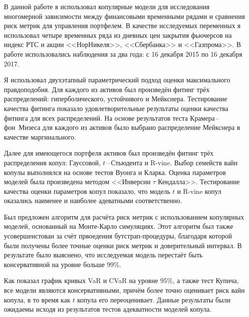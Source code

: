 \newpage


В данной работе я использовал копулярные модели для исследования многомерной зависимости между финансовыми временными рядами и сравнения риск метрик для управления портфелем.
В качестве исследуемых переменных я использовал четыре временных ряда из дневных цен закрытия фьючерсов на индекс РТС и акции <<НорНикеля>>, <<Сбербанка>> и <<Газпрома>>.
В работе использовались наблюдения за два года: с 16 декабря 2015 по 16 декабря 2017.

Я использовал двухэтапный параметрический подход оценки максимального правдоподобия.
Для каждого из активов был произведён фитинг трёх распределений: гиперболического, устойчивого и Мейкснера.
Тестирование качества фитинга показало удовлетворительные результаты оценки качества фитинга для всех распределений.
На основе результатов теста Крамера\,--\,фон~Мизеса для каждого из активов было выбрано распределение Мейкснера в качестве маргинального.

Далее для имеющегося портфеля активов был произведён фитинг трёх распределения копул: Гауссовой, $t$\,--\,Стьюдента и R-vine.
Выбор семейств вайн копулы выполнялся на основе тестов Вуонга и Кларка.
Оценка параметров моделей была произведена методом <<Инверсии $\tau$ Кендалла>>.
Тестирование качества оценки параметров копул показало, что модель $t$ и R-vine копул оказались наименее и наиболее адеватными соответственно.

Был предложен алгоритм для расчёта риск метрик с использованием копулярных моделей, основанный на Монте-Карло симуляциях.
Этот алгоритм был также усовершенстован за счёт првоедения бутстрап-процедуры, благодаря которой были получены более точные оценки риск метрик и доверительный интервал.
В результате было выяснено, что исследуемая модель перестаёт быть консервативной на уровне больше 99\%.

Как показал график кривых VaR и CVaR на уровне 95\%, а также тест Купича, все модели являются консервативными, причём более точно оценивает риск вайн копула, в то время как $t$ копула его переоценивает.
Данные результаты были ожидаемы исходя из результатов тестов адекватности моделей копула.